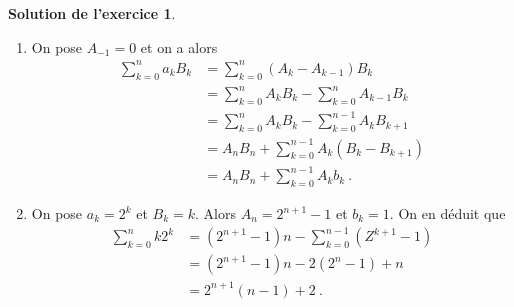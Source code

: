 \documentclass[a4paper, 11pt,openany]{article}%
\theoremstyle{plain}
\theoremstyle{definition}
\newtheorem{sol}{Solution de l'exercice}
\theoremstyle{remark}
\begin{document}
\begin{sol}
	\begin{enumerate}
		\item On pose $A_{-1}=0$ et on a alors 
		\[
			\begin{aligned}
				\sum_{k=0}^n a_kB_k &= \sum_{k=0}^n (A_k-A_{k-1})B_k \\
				&= \sum_{k=0}^n A_kB_k - \sum_{k=0}^n A_{k-1}B_k \\
				&= \sum_{k=0}^n A_kB_k - \sum_{k=0}^{n-1} A_{k}B_{k+1} \\
				&= A_nB_n + \sum_{k=0}^{n-1} A_{k}(B_k - B_{k+1}) \\
				&= A_nB_n + \sum_{k=0}^{n-1} A_{k}b_k \ .
			\end{aligned}
		\]
		\item On pose $a_k = 2^k$ et $B_k = k$. Alors $A_n = 2^{n+1}-1$ et $b_k = 1$. On en déduit que 
		\[
			\begin{aligned}
				\sum_{k=0}^n k2^k 
				&= (2^{n+1}-1)n - \sum_{k=0}^{n-1}(Z^{k+1}-1) \\
				&= (2^{n+1}-1)n - 2(2^{n}-1) + n \\
				&= 2^{n+1}(n-1)+2 \ .
			\end{aligned}
		\]
	\end{enumerate}
\end{sol}
\end{document}
